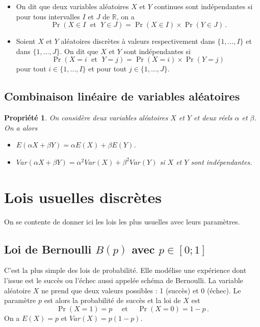 \documentclass[12pt, a4paper]{book}
\newtheorem{prop}[thm]{Propriété}
\numberwithin{equation}{section}
\newcommand{\R}{{\mathbb R}}
\begin{document}
\begin{itemize}
  \item On dit que deux variables aléatoires $X$ et $Y$ continues sont indépendantes si pour tous intervalles $I$ et $J$ de $\R$, on a
\[ \Pr(X\in I\;{\mbox { et }}\; Y\in J)=\Pr(X\in I)\times \Pr(Y\in J)\,.\]
	\item Soient $X$ et $Y$ aléatoires discrètes à valeurs respectivement dans $\{1,\ldots,I\}$
et dans  $\{1,\ldots,J\}$. On dit que $X$ et $Y$ sont indépendantes si
$$\Pr(X=i\;{\mbox { et }}\; Y=j)=\Pr(X=i)\times \Pr(Y=j)\,$$
pour tout $i \in \{1,\ldots,I\} $ et pour tout $j \in \{1,\ldots,J\}$.
\end{itemize}

\subsection{Combinaison linéaire de variables aléatoires}

\begin{prop}
On considère deux variables aléatoires $X$ et $Y$ et deux réels $\alpha$ et $\beta$. On a alors
\begin{itemize}
\item[] $E(\alpha X+\beta Y) =  \alpha E(X) + \beta E(Y)$.
\item[] $Var(\alpha X+\beta Y) = \alpha^2 Var(X) + \beta^2 Var(Y)$ si $X$ et $Y$ sont indépendantes.
\end{itemize}
\end{prop}

\section{Lois usuelles discrètes}
On se contente de donner ici les lois les plus usuelles avec leurs paramètres.\\

\subsection[Loi de Bernoulli]{Loi de Bernoulli $B(p)$ avec $p\in[0;1]$} 
C'est la plus simple des lois de probabilité. Elle modélise une expérience dont l'issue est le succès ou l'échec aussi appelée schéma de Bernoulli. La variable aléatoire $X$ ne prend que deux valeurs possibles : 1 (succès) et 0 (échec). Le paramètre $p$ est alors la probabilité de succès et la loi de $X$ est
$$
\Pr(X=1)=p\quad {\mbox { et }} \quad \Pr(X=0)=1-p\,.
$$
On a $E(X)=p$ et $Var(X)=p(1-p)$.\\
\end{document}
